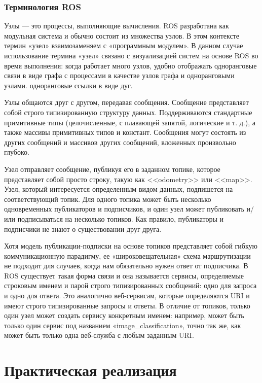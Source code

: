 \documentclass[12pt,a4paper]{scrartcl}
\begin{document}
				
				\subsubsection{Терминология ROS}
					Узлы — это процессы, выполняющие вычисления. ROS разработана как модульная система и обычно состоит из множества узлов. В этом контексте термин «узел» взаимозаменяем с «программным модулем». В данном случае использование термина «узел» связано с визуализацией систем на основе ROS во время выполнения: когда работает много узлов, удобно отображать одноранговые связи в виде графа с процессами в качестве узлов графа и одноранговыми узлами. одноранговые ссылки в виде дуг.
					
					Узлы общаются друг с другом, передавая сообщения. Сообщение представляет собой строго типизированную структуру данных. Поддерживаются стандартные примитивные типы (целочисленные, с плавающей запятой, логические и т. д.), а также массивы примитивных типов и констант. Сообщения могут состоять из других сообщений и массивов других сообщений, вложенных произвольно глубоко.
					
					Узел отправляет сообщение, публикуя его в заданном топике, которое представляет собой просто строку, такую как <<odometry>> или <<map>>. Узел, который интересуется определенным видом данных, подпишется на соответствующий топик. Для одного топика может быть несколько одновременных публикаторов и подписчиков, и один узел может публиковать и/или подписываться на несколько топиков. Как правило, публикаторы и подписчики не знают о существовании друг друга.
					
					Хотя модель публикации-подписки на основе топиков представляет собой гибкую коммуникационную парадигму, ее «широковещательная» схема маршрутизации не подходит для случаев, когда нам обязательно нужен ответ от подписчика. В ROS существует такая форма связи и она называется сервисы, определяемые строковым именем и парой строго типизированных сообщений: одно для запроса и одно для ответа. Это аналогично веб-сервисам, которые определяются URI и имеют строго типизированные запросы и ответы. В отличие от топиков, только один узел может создать сервису конкретным именем: например, может быть только один сервис под названием «image\_classification», точно так же, как может быть только одна веб-служба с любым заданным URI\cite{bib:ROSTerms}.
			
		\section{Практическая реализация} \label{sec:practice}
		
\end{document}
